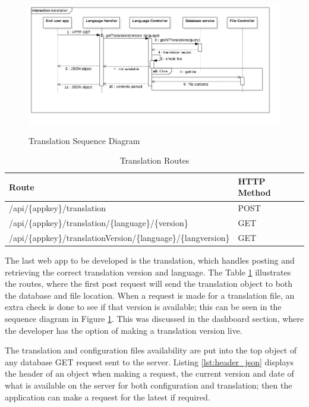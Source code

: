 \begin{figure}[!h]
    \caption{Translation Sequence Diagram}
    \centering
    \includegraphics[width=150mm]{images/sequence/translation}
    \label{fig:translation-s}
\end{figure}

\begin{table}[!h]
\centering
\caption{Translation Routes}
\label{tb:translation-routes}
\begin{tabular}{|l|l|}
\hline
\rowcolor{green!20}
Route                                        & HTTP Method \\ \hline
/api/\{appkey\}/translation                  & POST        \\ \hline
/api/\{appkey\}/translation/\{language\}/\{version\}           & GET         \\ \hline
/api/\{appkey\}/translationVersion/\{language\}/\{langversion\} & GET         \\ \hline
\end{tabular}
\end{table}

The last web app to be developed is the translation, which handles posting and retrieving the correct translation version and language. The Table \ref{tb:translation-routes} illustrates the routes, where the first post request will send the translation object to both the database and file location. When a request is made for a translation file, an extra check is done to see if that version is available; this can be seen in the sequence diagram in Figure \ref{fig:translation-s}. This was discussed in the dashboard section, where the developer has the option of making a translation version live.

The translation and configuration files availability are put into the top object of any database GET request sent to the server. Listing \ref{lst:header_json} displays the header of an object when making a request, the current version and date of what is available on the server for both configuration and translation; then the application can make a request for the latest if required.


